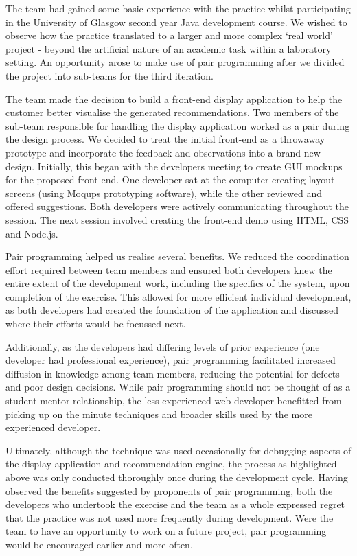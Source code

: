 \documentclass{l3proj}
\begin{document}
The team had gained some basic experience with the practice whilst participating in the University of Glasgow second year Java development course. We wished to observe how the practice translated to a larger and more complex `real world’ project - beyond the artificial nature of an academic task within a laboratory setting. An opportunity arose to make use of pair programming after we divided the project into sub-teams for the third iteration.

The team made the decision to build a front-end display application to help the customer better visualise the generated recommendations. Two members of the sub-team responsible for handling the display application worked as a pair during the design process. We decided to treat the initial front-end as a throwaway prototype and incorporate the feedback and observations into a brand new design. Initially, this began with the developers meeting to create GUI mockups for the proposed front-end. One developer sat at the computer creating layout screens (using Moqups prototyping software), while the other reviewed and offered suggestions. Both developers were actively communicating throughout the session. The next session involved creating the front-end demo using HTML, CSS and Node.js.

Pair programming helped us realise several benefits. We reduced the coordination effort required between team members and ensured both developers knew the entire extent of the development work, including the specifics of the system, upon completion of the exercise. This allowed for more efficient individual development, as both developers had created the foundation of the application and discussed where their efforts would be focussed next.

Additionally, as the developers had differing levels of prior experience (one developer had professional experience), pair programming facilitated increased diffusion in knowledge among team members, reducing the potential for defects and poor design decisions. While pair programming should not be thought of as a student-mentor relationship, the less experienced web developer benefitted from picking up on the minute techniques and broader skills used by the more experienced developer.

Ultimately, although the technique was used occasionally for debugging aspects of the display application and recommendation engine, the process as highlighted above was only conducted thoroughly once during the development cycle. Having observed the benefits suggested by proponents of pair programming, both the developers who undertook the exercise and the team as a whole expressed regret that the practice was not used more frequently during development. Were the team to have an opportunity to work on a future project, pair programming would be encouraged earlier and more often.
\end{document}
